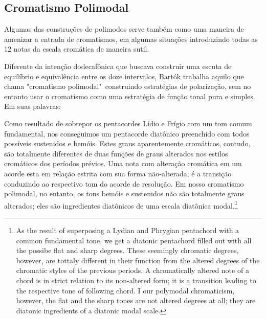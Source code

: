 \documentclass[
	12pt,				%
	openright,			%
	twoside,			%
	a4paper,			%
	english,			%
	french,				%
	spanish,			%
	brazil				%
	]{abntex2}
\begin{document}
\subsection{Cromatismo Polimodal}
\label{polimodal}

Algumas das construções de polimodos serve também como uma maneira de amenizar a entrada de cromatismos, em algumas situações introduzindo todas as 12 notas da escala cromática de maneira sutil. 

Diferente da intenção dodecafônica que buscava construir uma escuta de equilíbrio e equivalência entre os doze intervalos, Bartók trabalha aquilo que chama "cromatismo polimodal"\ construindo estratégias de polarização, sem no entanto usar o cromatismo como uma estratégia de função tonal pura e simples. Em suas palavras:

\begin{citacao}
Como resultado de sobrepor os pentacordes Lídio e Frígio com um tom comum fundamental, nos conseguimos um pentacorde diatônico preenchido com todos possíveis sustenidos e bemóis. Estes graus aparentemente cromáticos, contudo, são totalmente diferentes de duas funções de graus alterados nos estilos cromáticos dos períodos prévios. Uma nota com alteração cromática em um acorde esta em relação estrita com sua forma não-alterada; é a transição conduzindo ao respectivo tom do acorde de resolução. Em nosso cromatismo polimodal, no entanto, os tons bemóis e sustenidos não são totalmente graus alterados; eles são ingredientes diatônicos de uma escala diatônica modal.\cite[p. 367]{bartok1993bela}\footnote{As the result of superposing a Lydian and Phrygian pentachord with a common fundamental tone, we get a diatonic pentachord filled out with all the possibe flat and sharp degrees. These seemingly chromatic degrees, however, are tottaly different in their function from the altered degrees of the chromatic styles of the previous periods. A chromatically altered note of a chord is in strict relation to its non-altered form; it is a transition leading to the respective tone of following chord. I our polymodal chromaticism, however, the flat and the sharp tones are not altered degrees at all; they are diatonic ingredients of a diatonic modal scale.\cite[p. 367]{bartok1993bela}}
\end{citacao}
\end{document}
